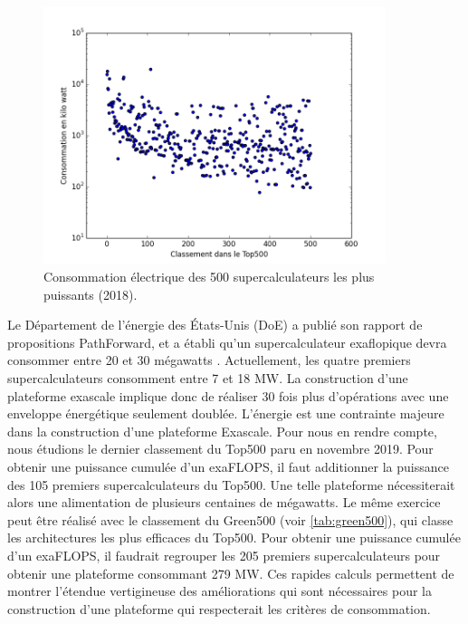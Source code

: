                 \begin{figure}
                    \center
                    \includegraphics[width=10cm]{images/Chapitre1/pic_top500_power.png}
                    \caption{\label{pic_top500_power} Consommation électrique des 500 supercalculateurs les plus puissants (2018).}
                \end{figure}
      
      
        Le Département de l'énergie des États-Unis (DoE) a publié son rapport de propositions PathForward, et a établi qu'un supercalculateur exaflopique devra consommer entre 20 et 30 mégawatts \cite{Ang2016}. Actuellement, les quatre premiers supercalculateurs consomment entre 7 et 18 MW. La construction d'une plateforme exascale implique donc de réaliser 30 fois plus d'opérations avec une enveloppe énergétique seulement doublée. L'énergie est une contrainte majeure dans la construction d'une plateforme Exascale. Pour nous en rendre compte, nous étudions le dernier classement du Top500 paru en novembre 2019. Pour obtenir une puissance cumulée d'un exaFLOPS, il faut additionner la puissance des 105 premiers supercalculateurs du Top500. Une telle plateforme nécessiterait alors une alimentation de plusieurs centaines de mégawatts. Le même exercice peut être réalisé avec le classement du Green500 (voir \autoref{tab:green500}), qui classe les architectures les plus efficaces du Top500. Pour obtenir une puissance cumulée d'un exaFLOPS, il faudrait regrouper les 205 premiers supercalculateurs pour obtenir une plateforme consommant 279 MW. Ces rapides calculs permettent de montrer l'étendue vertigineuse des améliorations qui sont nécessaires pour la construction d'une plateforme qui respecterait les critères de consommation. 
        
        
        
